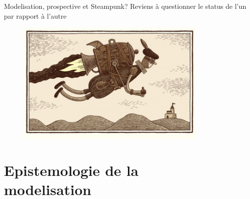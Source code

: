 \documentclass[newPxFont]{beamer}
\begin{document}
\begin{frame}[c]{Modelisation, prospective et Steampunk?}
\vspace{-1cm}
Reviens à questionner le status de l'un par rapport à l'autre
\begin{figure}
  \includegraphics[height=6cm]{img/a_Tom-Gauld-jetpack.jpg}
\end{figure}
\end{frame}

\section{Epistemologie de la\\ modelisation}

\end{document}
